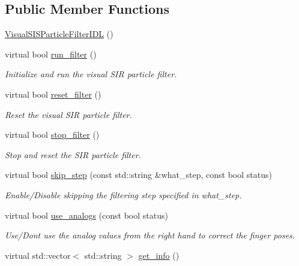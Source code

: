 \subsection*{Public Member Functions}
\begin{DoxyCompactItemize}
\item 
\hyperlink{classVisualSISParticleFilterIDL_ae295be0ced0b306a7b2a27e4b5e4df60}{Visual\+S\+I\+S\+Particle\+Filter\+I\+DL} ()
\item 
virtual bool \hyperlink{classVisualSISParticleFilterIDL_a6a8c16192597ea78617f10691b07df08}{run\+\_\+filter} ()
\begin{DoxyCompactList}\small\item\em Initialize and run the visual S\+IR particle filter. \end{DoxyCompactList}\item 
virtual bool \hyperlink{classVisualSISParticleFilterIDL_ad6047accd0fe743bdbd158cb9b6fc11b}{reset\+\_\+filter} ()
\begin{DoxyCompactList}\small\item\em Reset the visual S\+IR particle filter. \end{DoxyCompactList}\item 
virtual bool \hyperlink{classVisualSISParticleFilterIDL_a8a30501c75b4c7152a2abff96a950b63}{stop\+\_\+filter} ()
\begin{DoxyCompactList}\small\item\em Stop and reset the S\+IR particle filter. \end{DoxyCompactList}\item 
virtual bool \hyperlink{classVisualSISParticleFilterIDL_a09d343c25082f2056546c6e95d397eaf}{skip\+\_\+step} (const std\+::string \&what\+\_\+step, const bool status)
\begin{DoxyCompactList}\small\item\em Enable/\+Disable skipping the filtering step specified in what\+\_\+step. \end{DoxyCompactList}\item 
virtual bool \hyperlink{classVisualSISParticleFilterIDL_a4fee3e1fbc6676767f99c8b552434709}{use\+\_\+analogs} (const bool status)
\begin{DoxyCompactList}\small\item\em Use/\+Don\textquotesingle{}t use the analog values from the right hand to correct the finger poses. \end{DoxyCompactList}\item 
virtual std\+::vector$<$ std\+::string $>$ \hyperlink{classVisualSISParticleFilterIDL_a0721bc76b2d5848908a39e3a9c9740c0}{get\+\_\+info} ()

\end{DoxyCompactItemize}
